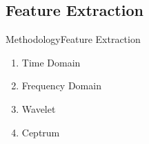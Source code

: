 \documentclass[10pt]{beamer}
\begin{document}
\subsection{Feature Extraction}

\begin{frame}{Methodology}{Feature Extraction}

\begin{enumerate}
	\item Time Domain
	\item Frequency Domain
	\item Wavelet
	\item Ceptrum
\end{enumerate}{}

\end{frame}
\end{document}
